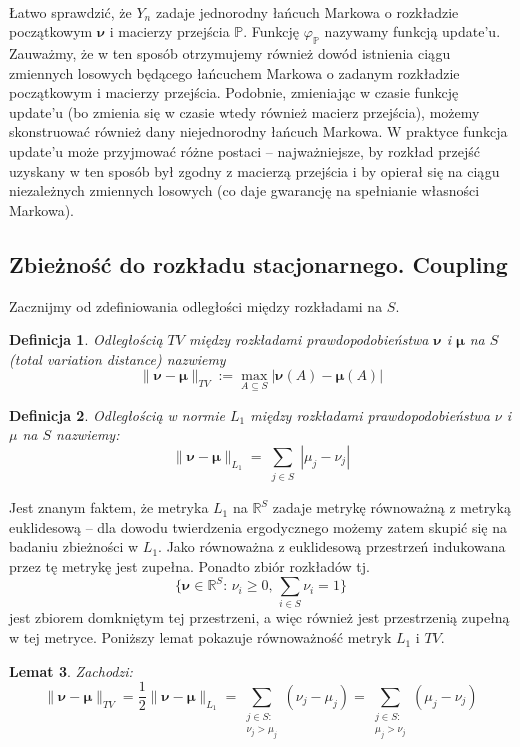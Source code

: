 \documentclass[a4paper]{article}
\theoremstyle{defn}
\newtheorem{defn}{Definicja}[subsection]
\theoremstyle{theorem}
\theoremstyle{lemma}
\newtheorem{lemma}[defn]{Lemat}
\theoremstyle{cor}
\theoremstyle{fact}
\begin{document}
\\
Łatwo sprawdzić, że $Y_n$ zadaje jednorodny łańcuch Markowa o rozkładzie początkowym $\boldsymbol{\nu}$ i macierzy przejścia $\mathbb{P}$. Funkcję $\varphi_{\mathbb{P}}$ nazywamy funkcją update'u. Zauważmy, że w ten sposób otrzymujemy również dowód istnienia ciągu zmiennych losowych będącego łańcuchem Markowa o zadanym rozkładzie początkowym i macierzy przejścia.
Podobnie, zmieniając w czasie funkcję update'u (bo zmienia się w czasie wtedy również macierz przejścia), możemy skonstruować również dany niejednorodny łańcuch Markowa. W praktyce funkcja update'u może przyjmować różne postaci – najważniejsze, by rozkład przejść uzyskany w ten sposób był zgodny z macierzą przejścia i by opierał się na ciągu niezależnych zmiennych losowych (co daje gwarancję na spełnianie własności Markowa).
\subsection{Zbieżność do rozkładu stacjonarnego. Coupling}
\label{sect2.4}
Zacznijmy od zdefiniowania odległości między rozkładami na $S$.
\begin{defn}\label{defn2.4.1}
Odległością $TV$ między rozkładami prawdopodobieństwa $\boldsymbol{\nu}$ i $\boldsymbol{\mu}$ na $S$ (\textit{total variation distance}) nazwiemy $$\|\boldsymbol{\nu} - \boldsymbol{\mu}\|_{TV} := \max\limits_{A \subseteq S} |\boldsymbol{\nu}(A) - \boldsymbol{\mu}(A)|$$
\end{defn}
\begin{defn}\label{defn2.4.2}
Odległością w normie $L_1$ między rozkładami prawdopodobieństwa $\nu$ i $\mu$ na $S$ nazwiemy:
$$\|\boldsymbol{\nu} - \boldsymbol{\mu}\|_{L_1} = \sum\limits_{\substack{j \in S}} |\mu_j - \nu_j|$$
\end{defn}
Jest znanym faktem, że metryka $L_1$ na $\mathbb{R}^S$ zadaje metrykę równoważną z metryką euklidesową – dla dowodu twierdzenia ergodycznego możemy zatem skupić się na badaniu zbieżności w $L_1$. Jako równoważna z euklidesową przestrzeń indukowana przez tę metrykę jest zupełna. Ponadto zbiór rozkładów tj.
$$\{\boldsymbol{\nu} \in \mathbb{R}^S:\, \nu_i \geq 0, \, \sum\limits_{i \in S} \nu_i = 1\}$$
jest zbiorem domkniętym tej przestrzeni, a więc również jest przestrzenią zupełną w tej metryce. Poniższy lemat pokazuje równoważność metryk $L_1$ i $TV$.
\begin{lemma}\label{lemma2.4.3}
Zachodzi:
$$\|\boldsymbol{\nu} - \boldsymbol{\mu}\|_{TV} = \frac{1}{2}\|\boldsymbol{\nu} - \boldsymbol{\mu}\|_{L_1} = \sum\limits_{\substack{j \in S:\\ \nu_j > \mu_j}} (\nu_j - \mu_j) = \sum\limits_{\substack{j \in S:\\ \mu_j > \nu_j}} (\mu_j - \nu_j)$$
\end{lemma}
\end{document}
